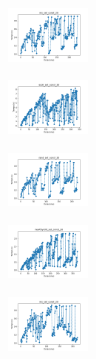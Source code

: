 \begin{figure}[H]    
    \centering
    \begin{subfigure}
        \centering
        \includegraphics[width=0.234\textwidth]{img/ils/iris_set_const_20_949004259_time.png}
    \end{subfigure}
    \hfill
    \begin{subfigure}
        \centering
        \includegraphics[width=0.234\textwidth]{img/ils/ecoli_set_const_20_949004259_time.png}
    \end{subfigure}
    \hfill
    \begin{subfigure}
        \centering
        \includegraphics[width=0.234\textwidth]{img/ils/rand_set_const_20_949004259_time.png}
    \end{subfigure}
    \hfill
    \begin{subfigure}
        \centering
        \includegraphics[width=0.234\textwidth]{img/ils/newthyroid_set_const_20_949004259_time.png}
    \end{subfigure}
    \hfill
    \begin{subfigure}
        \centering
        \includegraphics[width=0.234\textwidth]{img/ils/iris_set_const_20_589741062_time.png}
    \end{subfigure}
    \hfill
    \begin{subfigure}

\end{subfigure}
\end{figure}
